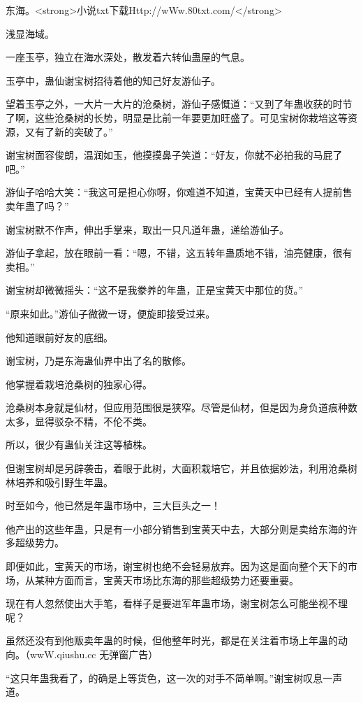 
\begin{this_body}

东海。<strong>小说txt下载Http://wWw.80txt.com/</strong>

浅显海域。

一座玉亭，独立在海水深处，散发着六转仙蛊屋的气息。

玉亭中，蛊仙谢宝树招待着他的知己好友游仙子。

望着玉亭之外，一大片一大片的沧桑树，游仙子感慨道：“又到了年蛊收获的时节了啊，这些沧桑树的长势，明显是比前一年要更加旺盛了。可见宝树你栽培这等资源，又有了新的突破了。”

谢宝树面容俊朗，温润如玉，他摸摸鼻子笑道：“好友，你就不必拍我的马屁了吧。”

游仙子哈哈大笑：“我这可是担心你呀，你难道不知道，宝黄天中已经有人提前售卖年蛊了吗？”

谢宝树默不作声，伸出手掌来，取出一只凡道年蛊，递给游仙子。

游仙子拿起，放在眼前一看：“嗯，不错，这五转年蛊质地不错，油亮健康，很有卖相。”

谢宝树却微微摇头：“这不是我豢养的年蛊，正是宝黄天中那位的货。”

“原来如此。”游仙子微微一讶，便旋即接受过来。

他知道眼前好友的底细。

谢宝树，乃是东海蛊仙界中出了名的散修。

他掌握着栽培沧桑树的独家心得。

沧桑树本身就是仙材，但应用范围很是狭窄。尽管是仙材，但是因为身负道痕种数太多，显得驳杂不精，不伦不类。

所以，很少有蛊仙关注这等植株。

但谢宝树却是另辟袭击，着眼于此树，大面积栽培它，并且依据妙法，利用沧桑树林培养和吸引野生年蛊。

时至如今，他已然是年蛊市场中，三大巨头之一！

他产出的这些年蛊，只是有一小部分销售到宝黄天中去，大部分则是卖给东海的许多超级势力。

即便如此，宝黄天的市场，谢宝树也绝不会轻易放弃。因为这是面向整个天下的市场，从某种方面而言，宝黄天市场比东海的那些超级势力还要重要。

现在有人忽然使出大手笔，看样子是要进军年蛊市场，谢宝树怎么可能坐视不理呢？

虽然还没有到他贩卖年蛊的时候，但他整年时光，都是在关注着市场上年蛊的动向。（wwW.qiushu.cc 无弹窗广告）

“这只年蛊我看了，的确是上等货色，这一次的对手不简单啊。”谢宝树叹息一声道。


\end{this_body}
